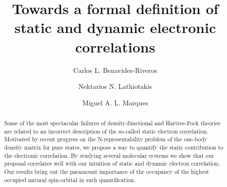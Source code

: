 \documentclass[aps,twocolumn,showpacs,pra,superscriptaddress,floatfix,longbibliography]{revtex4-1}
\newcommand{\7}{\dagger}
\begin{document}
\title{Towards a formal definition of static and dynamic electronic correlations}
  
\author{Carlos L. Benavides-Riveros}

\author{Nektarios N. Lathiotakis}

\author{Miguel A. L. Marques}




%
%
%
%
%




\begin{abstract}
Some of the most spectacular failures of density-functional 
and Hartree-Fock theories are related to an incorrect 
description of the so-called static electron correlation. 
Motivated by recent progress on the N-representability 
problem of the one-body density matrix for pure states, 
we propose a way to quantify the static contribution to the 
electronic correlation.
By studying several molecular systems we show that our
proposal correlates well with our intuition of static and dynamic 
electron correlation. Our results bring out the paramount importance
of the occupancy of the highest occupied natural spin-orbital
in such quantification. 
\end{abstract}
\end{document}
